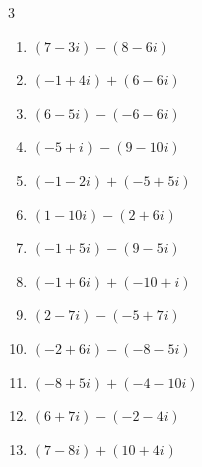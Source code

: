 \begin{multicols}{3}
\begin{enumerate}
  \item $\displaystyle (7-3i) - (8-6i)$

        \phantom{$\displaystyle =-1+3i$}

  \item $\displaystyle (-1+4i) + (6-6i)$

        \phantom{$\displaystyle =5-2i$}

  \item $\displaystyle (6-5i) - (-6-6i)$

        \phantom{$\displaystyle =12+i$}

  \item $\displaystyle (-5+i) - (9-10i)$

        \phantom{$\displaystyle =-14+11i$}

  \item $\displaystyle (-1-2i) + (-5+5i)$

        \phantom{$\displaystyle =-6+3i$}

  \item $\displaystyle (1-10i) - (2+6i)$

        \phantom{$\displaystyle =-1-16i$}

  \item $\displaystyle (-1+5i) - (9-5i)$

        \phantom{$\displaystyle =-10+10i$}

  \item $\displaystyle (-1+6i) + (-10+i)$

        \phantom{$\displaystyle =-11+7i$}

\columnbreak %

  \item $\displaystyle (2-7i) - (-5+7i)$

        \phantom{$\displaystyle =7-14i$}

  \item $\displaystyle (-2+6i) - (-8-5i)$

        \phantom{$\displaystyle =6+11i$}

  \item $\displaystyle (-8+5i) + (-4-10i)$

        \phantom{$\displaystyle =-12-5i$}

  \item $\displaystyle (6+7i) - (-2-4i)$

        \phantom{$\displaystyle =8+11i$}

  \item $\displaystyle (7-8i) + (10+4i)$


\end{enumerate}
\end{multicols}
